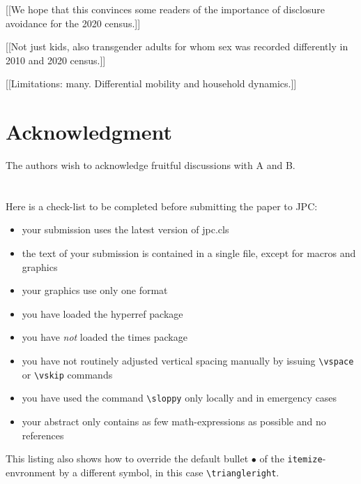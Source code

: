 \documentclass{jpc} %
\theoremstyle{plain}\newtheorem{satz}[thm]{Satz} %
\begin{document}
[[We hope that this convinces some readers of the importance of disclosure avoidance for the 2020 census.]]

[[Not just kids, also transgender adults for whom sex was recorded differently in 2010 and 2020 census.]]

[[Limitations: many. Differential mobility and household dynamics.]]

\section*{Acknowledgment}
  \noindent The authors wish to acknowledge fruitful discussions with
  A and B.





\appendix
\section{}
  Here is a check-list to be completed before submitting the paper to
  JPC:
\begin{itemize}[label=$\triangleright$]
\item your submission uses the latest version of jpc.cls
\item the text of your submission is contained in a single file,
  except for macros and graphics
\item your graphics use only one format
\item you have loaded the hyperref package
\item you have \emph{not} loaded the times package
\item you have not routinely adjusted vertical spacing manually by issuing
  \texttt{\textbackslash vspace} or \texttt{\textbackslash vskip} commands
\item you have used the command \texttt{\textbackslash sloppy} only
  locally and in emergency cases
\item your abstract only contains as few math-expressions as possible and no
  references
\end{itemize}

  This listing also shows how to override the default bullet $\bullet$
  of the \texttt{itemize}-envronment by a different symbol, in this
  case \texttt{\textbackslash triangleright}.
\end{document}
